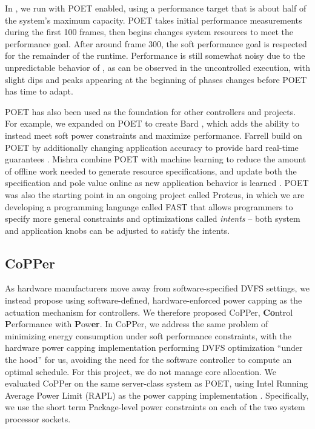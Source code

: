 In , we run with POET enabled, using a performance target that is about half of the system's maximum capacity.
POET takes initial performance measurements during the first 100 frames, then begins changes system resources to meet the performance goal.
After around frame 300, the soft performance goal is respected for the remainder of the runtime.
Performance is still somewhat noisy due to the unpredictable behavior of , as can be observed in the uncontrolled execution, with slight dips and peaks appearing at the beginning of phases changes before POET has time to adapt.

POET has also been used as the foundation for other controllers and projects.
For example, we expanded on POET to create Bard \cite{Bard}, which adds the ability to instead meet soft power constraints and maximize performance.
Farrell \etal build on POET by additionally changing application accuracy to provide hard real-time guarantees \cite{meantime}.
Mishra \etal combine POET with machine learning to reduce the amount of offline work needed to generate resource specifications, and update both the specification and pole value online as new application behavior is learned .
POET was also the starting point in an ongoing project called Proteus, in which we are developing a programming language called FAST that allows programmers to specify more general constraints and optimizations called \emph{intents} -- both system and application knobs can be adjusted to satisfy the intents.


\subsection{CoPPer}

As hardware manufacturers move away from software-specified DVFS settings, we instead propose using software-defined, hardware-enforced power capping as the actuation mechanism for controllers.
We therefore proposed CoPPer, \textbf{Co}ntrol \textbf{P}erformance with \textbf{P}ow\textbf{er}.
In CoPPer, we address the same problem of minimizing energy consumption under soft performance constraints, with the hardware power capping implementation performing DVFS optimization ``under the hood'' for us, avoiding the need for the software controller to compute an optimal schedule.
For this project, we do not manage core allocation.
We evaluated CoPPer on the same server-class system as POET, using Intel Running Average Power Limit (RAPL) as the power capping implementation \cite{RAPL}.
Specifically, we use the short term Package-level power constraints on each of the two system processor sockets.

